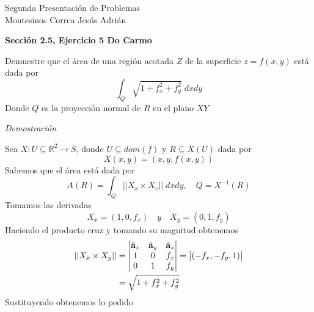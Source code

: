 \documentclass[letterpaper, 12pt]{article}
\begin{document}
\begin{center}
    Segunda Presentación de Problemas\\
    Montesinos Correa Jesús Adrián
\end{center}
{\bf Sección 2.5, Ejercicio 5 Do Carmo}

\noindent Demuestre que el área de una región acotada $Z$ de la superficie $z=f(x,y)$ está dada por \[\int_{Q}\sqrt{1+{f}_{x}^{2}+{f}_{y}^{2}}\; dxdy\] Donde $Q$ es la proyección normal de $R$ en el plano $XY$

{\it Demostración}

\noindent Sea $X: U\subseteq{\mathbb{R}}^{2}\to S$, donde $U\subseteq dom(f)$ y $R\subseteq X(U)$  dada por \[X(x,y)=(x,y,f(x,y))\] Sabemos que el área está dada por \[A(R)=\int_{Q}||{X}_{x}\times{X}_{v}||\; dxdy,\quad Q={X}^{-1}(R)\] Tomamos las derivadas \[{X}_{x}=\left(1,0,{f}_{x}\right)\quad y\quad {X}_{y}=\left(0,1,{f}_{y}\right)\] Haciendo el producto cruz y tomando su magnitud obtenemos
\begin{align*}
    ||{X}_{x}\times{X}_{y}|| & =\begin{vmatrix}
        {\hat{{\bf a}}}_{x} & {\hat{{\bf a}}}_{y} & {\hat{{\bf a}}}_{z} \\
        1                   & 0                   & {f}_{x}             \\
        0                   & 1                   & {f}_{y}
    \end{vmatrix}=\begin{vmatrix}
        (-{f}_{x},-{f}_{y},1)
    \end{vmatrix} \\
                             & =\sqrt{1+{f}_{x}^{2}+{f}_{y}^{2}}
\end{align*}
Sustituyendo obtenemos lo pedido
\end{document}
